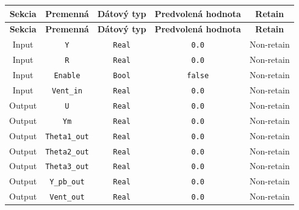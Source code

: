 \clearpage

\begin{center}

\label{tab:tia_mrac_vars} 

\fontsize{9pt}{11pt}\selectfont



\begin{longtable}{c c c c c}
  

    \textbf{Sekcia} & \textbf{Premenná} & \textbf{Dátový typ} & \textbf{Predvolená hodnota} & \textbf{Retain} \\ \toprule
    \endfirsthead

    \textbf{Sekcia} & \textbf{Premenná} & \textbf{Dátový typ} & \textbf{Predvolená hodnota} & \textbf{Retain} \\ \toprule
    \endhead

    \bottomrule
    \endfoot

    Input & \texttt{Y} & \texttt{Real} & \texttt{0.0} & Non-retain \\ %
    Input & \texttt{R} & \texttt{Real} & \texttt{0.0} & Non-retain \\ %
    Input & \texttt{Enable} & \texttt{Bool} & \texttt{false} & Non-retain \\ %
    Input & \texttt{Vent\_in} & \texttt{Real} & \texttt{0.0} & Non-retain \\ %

    Output & \texttt{U} & \texttt{Real} & \texttt{0.0} & Non-retain \\ %
    Output & \texttt{Ym} & \texttt{Real} & \texttt{0.0} & Non-retain \\ %
    Output & \texttt{Theta1\_out} & \texttt{Real} & \texttt{0.0} & Non-retain \\ %
    Output & \texttt{Theta2\_out} & \texttt{Real} & \texttt{0.0} & Non-retain \\ %
    Output & \texttt{Theta3\_out} & \texttt{Real} & \texttt{0.0} & Non-retain \\ %
    Output & \texttt{Y\_pb\_out} & \texttt{Real} & \texttt{0.0} & Non-retain \\ %
    Output & \texttt{Vent\_out} & \texttt{Real} & \texttt{0.0} & Non-retain \\ %


\end{longtable}
\end{center}

